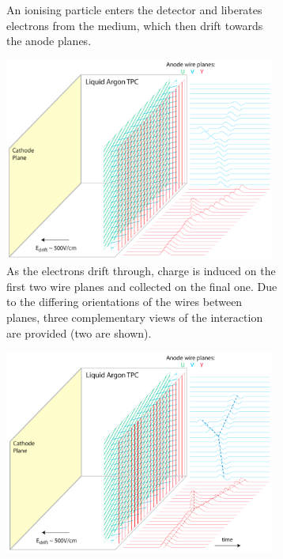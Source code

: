 \begin{figure}[p]
\begin{subfigure}[t]{0.48\linewidth}
    \caption{An ionising particle enters the detector and liberates electrons from the medium, which then drift towards the anode planes.}
    \label{fig:LArTPCOperation2}
  \end{subfigure}
  \hfill
    \begin{subfigure}[t]{0.48\linewidth}
    \centering
    \includegraphics[width=0.98\textwidth]{LArTPCOperation3.png}
    \caption{As the electrons drift through, charge is induced on the first two wire planes and collected on the final one.  Due to the differing orientations of the wires between planes, three complementary views of the interaction are provided (two are shown).}
    \label{fig:LArTPCOperation3}
  \end{subfigure}
  \hfill
  \begin{subfigure}[t]{0.48\linewidth}
    \centering
    \includegraphics[width=0.98\textwidth]{LArTPCOperation4.png}

\end{subfigure}
\end{figure}
